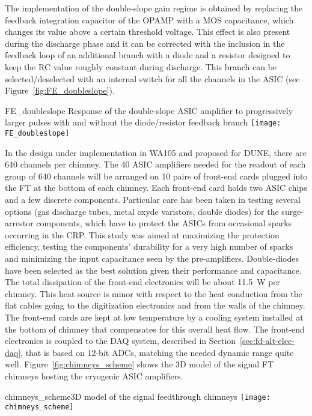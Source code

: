 The implementation of the double-slope gain regime is obtained by
replacing the feedback integration capacitor of the OPAMP with a MOS
capacitance, which changes its value above a certain threshold
voltage. This effect is also present during the discharge phase and it
can be corrected with the inclusion in the feedback loop of an
additional branch with a diode and a resistor designed to keep the RC
value roughly constant during discharge. This branch can be
selected/deselected with an internal switch for all the channels in
the ASIC (see Figure~\ref{fig:FE_doubleslope}).
\begin{cdrfigure}{FE_doubleslope}
{Response of the double-slope ASIC amplifier to progressively larger 
pulses with and without the diode/resistor feedback branch}
\texttt{[image: FE\_doubleslope]}
\end{cdrfigure}

In the design under implementation in WA105 and proposed for DUNE,
there are 640 channels per chimney. The 40 ASIC amplifiers needed for
the readout of each group of 640 channels will be arranged on 10 pairs
of front-end cards plugged into the FT at the bottom of each chimney.
Each front-end card holds two ASIC chips and a few discrete
components. Particular care has been taken in testing several options
(gas discharge tubes, metal oxyde varistors, double diodes) for the
surge-arrestor components, which have to protect the ASICs from
occasional sparks occurring in the CRP.  This study was aimed at
maximizing the protection efficiency, testing the components'
durability for a very high number of sparks and minimizing the input
capacitance seen by the pre-amplifiers. Double-diodes have been
selected as the best solution given their performance and
capacitance. The total dissipation of the front-end electronics will
be about 11.5~W per chimney. This heat source is minor with respect
to the heat conduction from the flat cables going to the digitization
electronics and from the walls of the chimney. The front-end cards are
kept at low temperature by a cooling system installed at the bottom of
chimney 
that compensates for this overall heat flow. The front-end
electronics is coupled to the DAQ system, described in Section~\ref{sec:fd-alt-elec-daq},
that is based on 12-bit ADCs, matching the needed dynamic
range quite well. Figure~\ref{fig:chimneys_scheme} shows the 3D model of the
signal FT chimneys hosting the cryogenic ASIC amplifiers.
\begin{cdrfigure}
{chimneys_scheme}{3D model of the signal feedthrough chimneys}
\texttt{[image: chimneys\_scheme]}
\end{cdrfigure}

